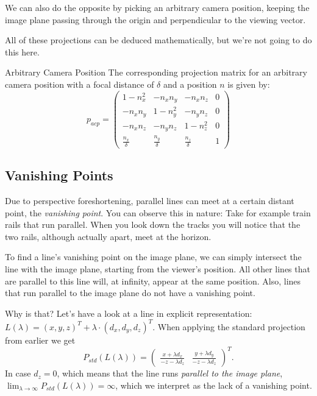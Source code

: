 \documentclass[english]{panikzettel}
\begin{document}
We can also do the opposite by picking an arbitrary camera position, keeping the image plane passing through the origin and perpendicular to the viewing vector.

All of these projections can be deduced mathematically, but we're not going to do this here.

\begin{defi}{Arbitrary Camera Position}
The corresponding projection matrix for an arbitrary camera position with a focal distance of $\delta$ and a position $n$ is given by:$$p_{acp} =
\begin{pmatrix}
1-n_x^2 & -n_xn_y & -n_xn_z & 0 \\
-n_xn_y & 1-n_y^2 & -n_yn_z & 0 \\
-n_xn_z & -n_yn_z & 1-n_z^2 & 0 \\
\frac{n_x}{\delta} & \frac{n_y}{\delta} & \frac{n_z}{\delta} & 1
\end{pmatrix}$$
\end{defi}

\subsection{Vanishing Points}
Due to perspective foreshortening, parallel lines can meet at a certain distant point, the \emph{vanishing point}. You can observe this in nature: Take for example train rails that run parallel. When you look down the tracks you will notice that the two rails, although actually apart, meet at the horizon.

To find a line's vanishing point on the image plane, we can simply intersect the line with the image plane, starting from the viewer's position. All other lines that are parallel to this line will, at infinity, appear at the same position. Also, lines that run parallel to the image plane do not have a vanishing point.

Why is that? Let's have a look at a line in explicit representation: $L(\lambda) = (x, y, z)^T + \lambda \cdot (d_x, d_y, d_z)^T$. When applying the standard projection from earlier we get $$P_{std} (L(\lambda)) = \begin{pmatrix} \frac{x + \lambda d_x}{-z - \lambda d_z} & \frac{y + \lambda d_y}{-z  - \lambda d_z} \end{pmatrix}^T.$$
In case $d_z = 0$, which means that the line runs \emph{parallel to the image plane}, $\lim_{\lambda \to \infty} P_{std} (L(\lambda)) = \infty$, which we interpret as the lack of a vanishing point.
\end{document}
